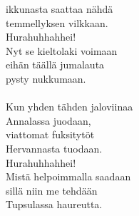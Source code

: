             ikkunasta saattaa nähdä \\
            temmellyksen vilkkaan. \\
            Hurahuhhahhei! \\
            Nyt se kieltolaki voimaan \\
            eihän täällä jumalauta \\
            pysty nukkumaan. \\
\hspace{10mm} \\
            Kun yhden tähden jaloviinaa \\
            Annalassa juodaan, \\
            viattomat fuksitytöt \\
            Hervannasta tuodaan. \\
            Hurahuhhahhei! \\
            Mistä helpoimmalla saadaan \\
            sillä niin me tehdään \\
            Tupsulassa haureutta. \\
